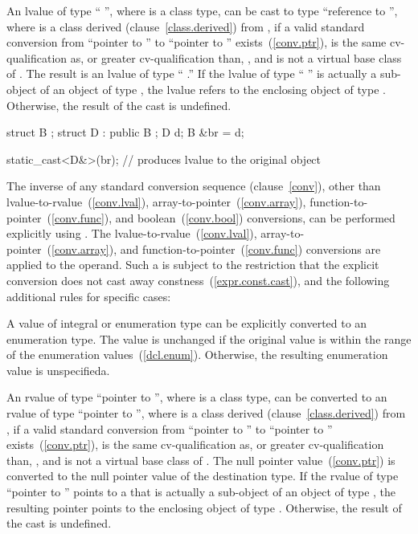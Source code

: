 \pnum
{}%
%
An lvalue of type `` '', where  is a class
type, can be cast to type ``reference to  '', where
 is a class derived (clause~\ref{class.derived}) from
, if a valid standard conversion from ``pointer to ''
to ``pointer to '' exists~(\ref{conv.ptr}),  is the
same cv-qualification as, or greater cv-qualification than,
, and  is not a virtual base class of .
The result is an lvalue of type `` .'' If the lvalue
of type `` '' is actually a sub-object of an object
of type , the lvalue refers to the enclosing object of type
. Otherwise, the result of the cast is undefined.
\enterexample 

\begin{codeblock}
struct B {};
struct D : public B {};
D d;
B &br = d;

static_cast<D&>(br);            // produces lvalue to the original  object
\end{codeblock}
\exitexampleb

\pnum
The inverse of any standard conversion sequence (clause~\ref{conv}),
other than lvalue-to-rvalue~(\ref{conv.lval}),
array-to-pointer~(\ref{conv.array}), function-to-pointer~(\ref{conv.func}),
and boolean~(\ref{conv.bool}) conversions, can be performed explicitly
using . The lvalue-to-rvalue~(\ref{conv.lval}),
array-to-pointer~(\ref{conv.array}), and
function-to-pointer~(\ref{conv.func}) conversions are applied to the
operand. Such a  is subject to the restriction that
the explicit conversion does not cast away
constness~(\ref{expr.const.cast}), and the following additional rules
for specific cases:

\pnum
{}%
%
A value of integral or enumeration type can be explicitly converted to
an enumeration type. The value is unchanged if the original value is
within the range of the enumeration values~(\ref{dcl.enum}). Otherwise,
the resulting enumeration value is unspecifieda.

\pnum
{}%
%
An rvalue of type ``pointer to  '', where 
is a class type, can be converted to an rvalue of type ``pointer to
 '', where  is a class derived
(clause~\ref{class.derived}) from , if a valid standard
conversion from ``pointer to '' to ``pointer to ''
exists~(\ref{conv.ptr}),  is the same cv-qualification as,
or greater cv-qualification than, , and  is not
a virtual base class of . The null pointer
value~(\ref{conv.ptr}) is converted
to the null pointer value of the destination type. If the rvalue of type
``pointer to  '' points to a  that is
actually a sub-object of an object of type , the resulting
pointer points to the enclosing object of type . Otherwise, the
result of the cast is undefined.

